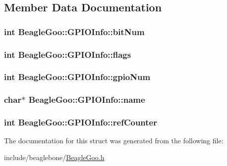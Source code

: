 \subsection{Member Data Documentation}
\hypertarget{struct_beagle_goo_1_1_g_p_i_o_info_a31959d0d24502777f3286e7ccb9c8e62}{
\subsubsection[{bit\-Num}]{\setlength{\rightskip}{0pt plus 5cm}int Beagle\-Goo\-::\-G\-P\-I\-O\-Info\-::bit\-Num}}\label{struct_beagle_goo_1_1_g_p_i_o_info_a31959d0d24502777f3286e7ccb9c8e62}
\hypertarget{struct_beagle_goo_1_1_g_p_i_o_info_afeb1ff6e6ad263177a9b1bb82e7a0043}{
\subsubsection[{flags}]{\setlength{\rightskip}{0pt plus 5cm}int Beagle\-Goo\-::\-G\-P\-I\-O\-Info\-::flags}}\label{struct_beagle_goo_1_1_g_p_i_o_info_afeb1ff6e6ad263177a9b1bb82e7a0043}
\hypertarget{struct_beagle_goo_1_1_g_p_i_o_info_a870d8a3d36706dd366eea2299ccb29fd}{
\subsubsection[{gpio\-Num}]{\setlength{\rightskip}{0pt plus 5cm}int Beagle\-Goo\-::\-G\-P\-I\-O\-Info\-::gpio\-Num}}\label{struct_beagle_goo_1_1_g_p_i_o_info_a870d8a3d36706dd366eea2299ccb29fd}
\hypertarget{struct_beagle_goo_1_1_g_p_i_o_info_aa887aa95188facb1a445920fb544134a}{
\subsubsection[{name}]{\setlength{\rightskip}{0pt plus 5cm}char$\ast$ Beagle\-Goo\-::\-G\-P\-I\-O\-Info\-::name}}\label{struct_beagle_goo_1_1_g_p_i_o_info_aa887aa95188facb1a445920fb544134a}
\hypertarget{struct_beagle_goo_1_1_g_p_i_o_info_af3bbf6d94585ef4a62bd579fef8564ac}{
\subsubsection[{ref\-Counter}]{\setlength{\rightskip}{0pt plus 5cm}int Beagle\-Goo\-::\-G\-P\-I\-O\-Info\-::ref\-Counter}}\label{struct_beagle_goo_1_1_g_p_i_o_info_af3bbf6d94585ef4a62bd579fef8564ac}


The documentation for this struct was generated from the following file\-:\begin{DoxyCompactItemize}
\item 
include/beaglebone/\hyperlink{_beagle_goo_8h}{Beagle\-Goo.\-h}\end{DoxyCompactItemize}
